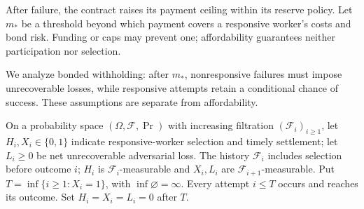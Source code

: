 \documentclass[runningheads,orivec]{llncs}
\begin{document}
After failure, the contract raises its payment ceiling within its reserve policy. Let $m_*$ be a threshold beyond which payment covers a responsive worker's costs and bond risk. Funding or caps may prevent one; affordability guarantees neither participation nor selection.

We analyze bonded withholding: after $m_*$, nonresponsive failures must impose unrecoverable losses, while responsive attempts retain a conditional chance of success. These assumptions are separate from affordability.

\begin{definition}\label{def:recovery}
On a probability space $(\Omega,\mathcal F,\Pr)$ with increasing filtration $(\mathcal F_i)_{i\geq1}$, let $H_i,X_i\in\{0,1\}$ indicate responsive-worker selection and timely settlement; let $L_i\geq0$ be net unrecoverable adversarial loss. The history $\mathcal F_i$ includes selection before outcome $i$; $H_i$ is $\mathcal F_i$-measurable and $X_i,L_i$ are $\mathcal F_{i+1}$-measurable. Put $T=\inf\{i\geq1:X_i=1\}$, with $\inf\varnothing=\infty$. Every attempt $i\leq T$ occurs and reaches its outcome. Set $H_i=X_i=L_i=0$ after $T$.
\end{definition}
\end{document}
